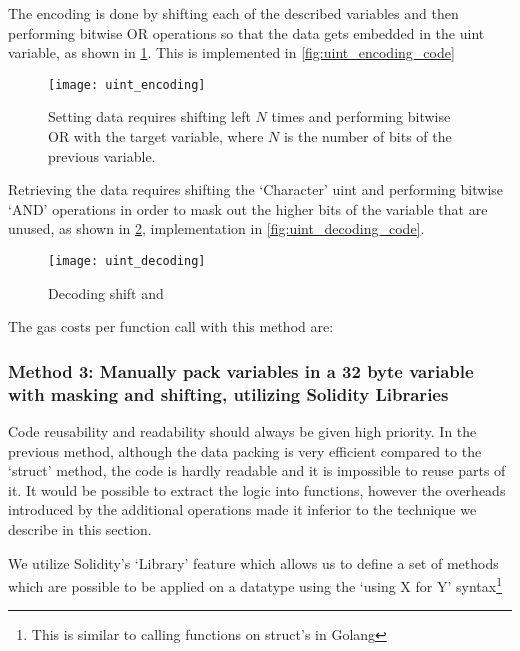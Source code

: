 The encoding is done by shifting each of the described variables and then performing bitwise OR operations so that the data gets embedded in the uint variable, as shown in \ref{fig:uint_encoding}. This is implemented in \ref{fig:uint_encoding_code}

\begin{figure}[H]
    \centering
    \texttt{[image: uint\_encoding]}
    \caption{Setting data requires shifting left $N$ times and performing bitwise OR with the target variable, where $N$ is the number of bits of the previous variable.}
    \label{fig:uint_encoding}
\end{figure}


Retrieving the data requires shifting the `Character' uint and performing bitwise `AND' operations in order to mask out the higher bits of the variable that are unused, as shown in \ref{fig:uint_decoding}, implementation in \ref{fig:uint_decoding_code}.

\begin{figure}[H]
    \centering
    \texttt{[image: uint\_decoding]}
    \caption{Decoding shift and}
    \label{fig:uint_decoding}
\end{figure}


The gas costs per function call with this method are: 


\subsubsection{Method 3: Manually pack variables in a 32 byte variable with masking and shifting, utilizing Solidity Libraries} \label{method3}

Code reusability and readability should always be given high priority. In the previous method, although the data packing is very efficient compared to the `struct' method, the code is hardly readable and it is impossible to reuse parts of it. It would be possible to extract the logic into functions, however the overheads introduced by the additional operations made it inferior to the technique we describe in this section.

We utilize Solidity's `Library' feature which allows us to define a set of methods which are possible to be applied on a datatype using the `using X for Y' syntax\footnote{This is similar to calling functions on struct's in Golang} 

